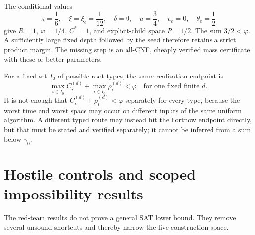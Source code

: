 \documentclass[11pt]{article}
\begin{document}
The conditional values
\[
 \kappa=\frac16,\quad \xi=\xi_e=\frac1{12},\quad
 \delta=0,\quad u=\frac34,\quad u_e=0,\quad\theta_e=\frac12
\]
give $R=1$, $w=1/4$, $C^*=1$, and explicit-child space $P=1/2$.
The sum $3/2<\varphi$.  A sufficiently large fixed depth followed by the
seed therefore retains a strict product margin.  The missing step is an
all-CNF, cheaply verified mass
certificate with these or better parameters.

For a fixed set $I_0$ of possible root types, the same-realization endpoint is
\begin{equation}
 \boxed{\max_{i\in I_0} C_i^{(d)}+
        \max_{i\in I_0}\rho_i^{(d)}<\varphi
        \quad\text{for one fixed finite }d.}
 \label{eq:same-realization}
\end{equation}
It is not enough that $C_i^{(d)}+\rho_i^{(d)}<\varphi$ separately for every
type, because the worst time and worst space may occur on different inputs of
the same uniform algorithm.  A different typed route may instead hit the
Fortnow endpoint directly, but that must be stated and verified separately;
it cannot be inferred from a sum below $\gamma_0$.

\section{Hostile controls and scoped impossibility results}

The red-team results do not prove a general SAT lower bound.  They remove
several unsound shortcuts and thereby narrow the live construction space.
\end{document}
